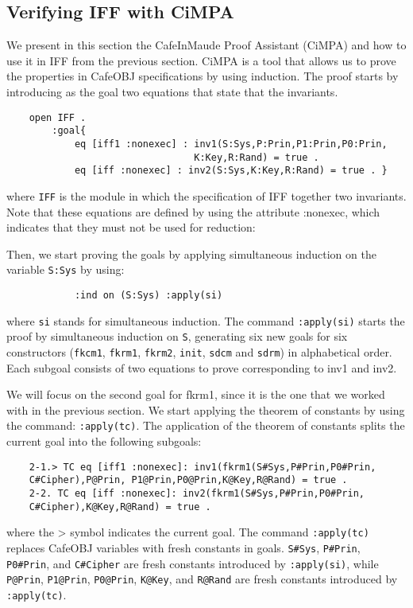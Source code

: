 \documentclass[a4paper,fleqn]{cas-dc}
\begin{document}
\subsection{Verifying IFF with CiMPA} \label{cimpa}
We present in this section the CafeInMaude Proof Assistant (CiMPA) and how to use it in IFF from the previous section. CiMPA is a tool that allows us to prove the properties in CafeOBJ specifications by using induction. The proof starts by introducing as the goal two equations that state that the invariants.
\begin{small}
	\begin{verbatim}
	open IFF .
		:goal{
			eq [iff1 :nonexec] : inv1(S:Sys,P:Prin,P1:Prin,P0:Prin,
			                     K:Key,R:Rand) = true .
			eq [iff :nonexec] : inv2(S:Sys,K:Key,R:Rand) = true . }
	\end{verbatim}
\end{small}  
	\noindent
where \verb!IFF! is the module in which the specification of IFF together two invariants. Note that these equations are defined by using the attribute :nonexec, which indicates that they must not be used for reduction:

Then, we start proving the goals by applying simultaneous
induction on the variable \verb!S:Sys! by using:
	\begin{small}
		\begin{verbatim}
			:ind on (S:Sys) :apply(si)
		\end{verbatim}
	\end{small}
	
 where \verb!si! stands for simultaneous induction. The command \verb!:apply(si)! starts the proof by simultaneous induction on \verb!S!, generating six new goals for six constructors (\verb!fkcm1!, \verb!fkrm1!, \verb!fkrm2!, \verb!init!, \verb!sdcm! and \verb!sdrm!) in alphabetical order. Each subgoal consists of two equations to prove corresponding to inv1 and inv2. 

We will focus on the second goal for fkrm1, since it is the one that we worked with in the previous section. We start applying the theorem of constants by using the command: \verb!:apply(tc)!. The application of the theorem of constants splits the current goal into the following subgoals:
\begin{small}
	\begin{verbatim}
	2-1.> TC eq [iff1 :nonexec]: inv1(fkrm1(S#Sys,P#Prin,P0#Prin,
	C#Cipher),P@Prin, P1@Prin,P0@Prin,K@Key,R@Rand) = true .
	2-2. TC eq [iff :nonexec]: inv2(fkrm1(S#Sys,P#Prin,P0#Prin,
	C#Cipher),K@Key,R@Rand) = true .
	\end{verbatim}
\end{small}
where the > symbol indicates the current goal.
The command \verb!:apply(tc)! replaces CafeOBJ variables with fresh constants in goals. \verb!S#Sys!, \verb!P#Prin!, \verb!P0#Prin!, and \verb!C#Cipher! are fresh constants introduced by \verb!:apply(si)!, while \verb!P@Prin!, \verb!P1@Prin!, \verb!P0@Prin!, \verb!K@Key!, and \verb!R@Rand! are fresh constants introduced by \verb!:apply(tc)!.
\end{document}
